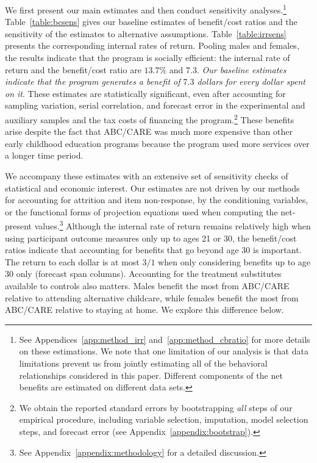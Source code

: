 We first present our main estimates and then conduct sensitivity analyses.\footnote{See Appendices~\ref{app:method_irr} and~\ref{app:method_cbratio} for more details on these estimations. We note that one limitation of our analysis is that data limitations prevent us from jointly estimating all of the behavioral relationships considered in this paper. Different components of the net benefits are estimated on different data sets.} Table~\ref{table:bcsens} gives our baseline estimates of benefit/cost ratios and the sensitivity of the estimates to alternative assumptions. Table~\ref{table:irrsens} presents the corresponding internal rates of return. Pooling males and females, the results indicate that the program is socially efficient: the internal rate of return and the benefit/cost ratio are $13.7\%$ and $7.3$. \textit{Our baseline estimates indicate that the program generates a benefit of $7.3$ dollars for every dollar spent on it}. These estimates are statistically significant, even after accounting for sampling variation, serial correlation, and forecast error in the experimental and auxiliary samples and the tax costs of financing the program.\footnote{We obtain the reported standard errors by bootstrapping \emph{all} steps of our empirical procedure, including variable selection, imputation, model selection steps, and forecast error (see  Appendix~\ref{appendix:bootstrap}).} These benefits arise despite the fact that ABC/CARE was much more expensive than other early childhood education programs because the program used more services over a longer time period.

We accompany these estimates with an extensive set of sensitivity checks of statistical and economic interest. Our estimates are not driven by our methods for accounting for attrition and item non-response, by the conditioning variables, or the functional forms of projection equations used when computing the net-present values.\footnote{See Appendix~\ref{appendix:methodology} for a detailed discussion.} Although the internal rate of return remains relatively high when using participant outcome measures only up to ages 21 or 30, the benefit/cost ratios indicate that accounting for benefits that go beyond age 30 is important. The return to each dollar is at most $3/1$ when only considering benefits up to age 30 only (forecast span columns). Accounting for the treatment substitutes available to controls also matters. Males benefit the most from ABC/CARE relative to attending alternative childcare, while females benefit the most from ABC/CARE relative to staying at home. We explore this difference below.

